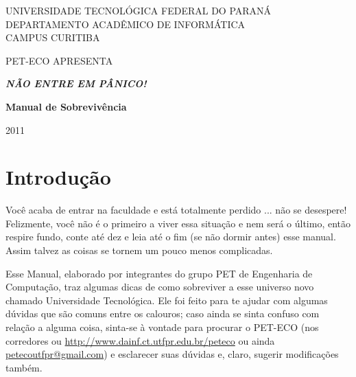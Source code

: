 \documentclass[a4paper,12pt,openany]{article}
\newcommand\BackgroundPic{
\put(0,0){
\parbox[b][\paperheight]{\paperwidth}{
\vfill
\centering
\vfill
}}}
\begin{document}
	\begin{titlepage}
	
	\AddToShipoutPicture*{\BackgroundPic}

        \begin{center}
            UNIVERSIDADE TECNOLÓGICA FEDERAL DO PARANÁ\\
            DEPARTAMENTO ACADÊMICO DE INFORMÁTICA\\
            CAMPUS CURITIBA
          
            \vspace{4cm}
            
            PET-ECO APRESENTA

            \vfill

	\Huge \emph { \textbf {NÃO ENTRE EM PÂNICO! }}


            \vspace{4cm}
            
	\LARGE \textbf {Manual de Sobrevivência}

            \vfill
            
            2011
        \end{center}

	\end{titlepage}

\thispagestyle{empty}
\tableofcontents

\newpage
\section{Introdução}

Você acaba de entrar na faculdade e está totalmente perdido  ... não se desespere! Felizmente, você não é o primeiro a viver essa situação e nem será o último, então respire fundo, conte até dez e leia até o fim (se não dormir antes) esse manual. Assim talvez as coisas se tornem um pouco menos complicadas. 

Esse Manual, elaborado por integrantes do grupo PET de Engenharia de Computação, traz algumas dicas de como sobreviver a esse universo novo chamado Universidade Tecnológica. Ele foi feito para te ajudar com algumas dúvidas que são comuns entre os calouros; caso ainda se sinta confuso com relação a alguma coisa, sinta-se à vontade para procurar o PET-ECO (nos corredores ou \url{http://www.dainf.ct.utfpr.edu.br/peteco} ou ainda \href{mailto:petecoutfpr@gmail.com}{petecoutfpr@gmail.com}) e esclarecer suas dúvidas e, claro, sugerir modificações também.
\end{document}
